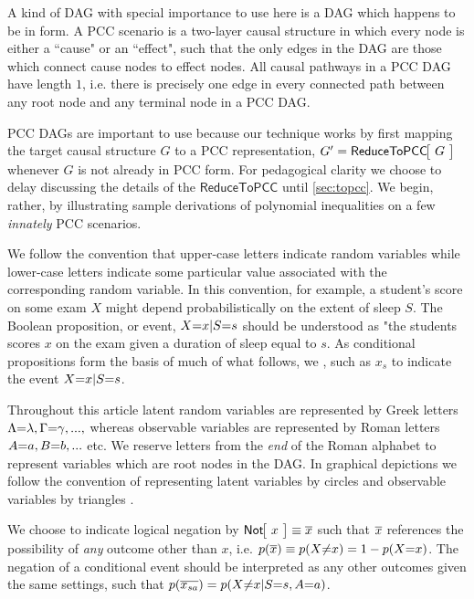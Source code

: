 A kind of DAG with special importance to use here is a DAG which happens to be in  form. A PCC scenario is a two-layer causal structure in which every node is either a ``cause" or an ``effect", such that the only edges in the DAG are those which connect cause nodes to effect nodes. All causal pathways in a PCC DAG have length $1$, i.e. there is precisely one edge in every connected path between any root node and any terminal node in a PCC DAG.

PCC DAGs are important to use because our technique works by first mapping the target causal structure $G$ to a PCC representation, $G'=\NamedFunction{ReduceToPCC}{\!G\!}$ whenever $G$ is not already in PCC form. For pedagogical clarity we choose to delay discussing the details of the $\mathsf{ReduceToPCC}$ until \cref{sec:topcc}. We begin, rather, by illustrating sample derivations of polynomial inequalities on a few \emph{innately} PCC scenarios.

We follow the convention that upper-case letters indicate random variables while lower-case letters indicate some particular value associated with the corresponding random variable. In this convention, for example, a student's score on some exam $X$ might depend probabilistically on the extent of sleep $S$. The Boolean proposition, or {event}, $X\mathord{=}x|S\mathord{=}s$ should be understood as "the students scores $x$ on the exam given a duration of sleep equal to $s$. As conditional propositions form the basis of much of what follows, we , such as $x_s$ to indicate the event $X\mathord{=}x | S\mathord{=}s$. 

 Throughout this article latent random variables are represented by Greek letters $\Lambda\mathord{=}\lambda,\Gamma\mathord{=}\gamma,...,$ whereas observable variables are represented by Roman letters $A\mathord{=}a,B\mathord{=}b,...$ etc. We reserve letters from the \emph{end} of the Roman alphabet to represent variables which are root nodes in the DAG. In graphical depictions we follow the convention of representing latent variables by circles and observable variables by triangles \cite{pusey2014gdag}.

We choose to indicate logical negation by $\NamedFunction{Not}{\!x\!}\equiv\n{x}$ such that $\overline{x}$ references the possibility of \emph{any} outcome other than $x$, i.e. $p\lparen\overline{x}\rparen\equiv p\lparen X\mathord{\neq}x\rparen=1-p\lparen X\mathord{=}x\rparen$. The negation of a conditional event should be interpreted as any other outcomes given the same settings, such that $p\lparen\overline{x_{s a}}\rparen=p\lparen X\mathord{\neq}x|S\mathord{=}s,A\mathord{=}a\rparen$.

